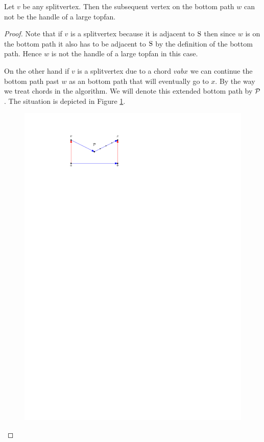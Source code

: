    \begin{lemma}
      \label{lm:sweep:NoTwoSplitsAboveEachOther}
      Let $v$ be any splitvertex. Then the subsequent vertex on the bottom path $w$ can not be the handle of a large topfan.
    \end{lemma}

    \begin{proof}
      Note that if $v$ is a splitvertex because it is adjacent to $\pS$ then since $w$ is on the bottom path it also has to be adjacent to $\pS$ by the definition of the bottom path.
      Hence $w$ is not the handle of a large topfan in this case.

      On the other hand if $v$ is a splitvertex due to a chord $v a b x$ we can continue the bottom path past $w$ as an bottom path that will eventually go to $x$. By the way we treat chords in the algorithm.  We will denote this extended bottom path by $\P$. The situation is depicted in Figure \ref{fig:botomPathChord}.

      \begin{figure}[h]
        \centering
        \includegraphics[scale=1]{unifiedAlgo/img/sweep/bottompathChord.pdf}
        \caption{}
        \label{fig:botomPathChord}
      \end{figure}


\end{proof}
